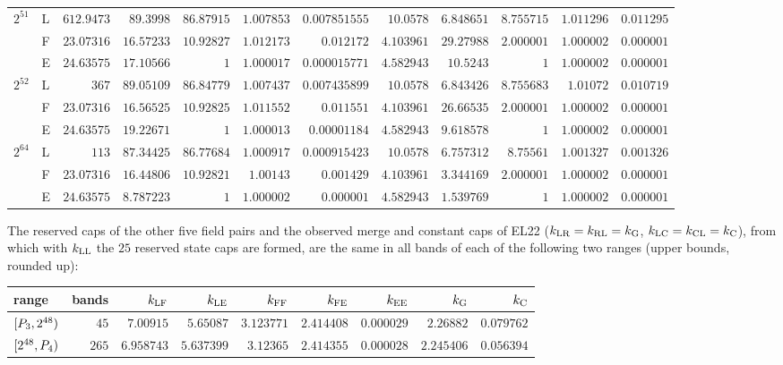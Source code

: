 \begin{center}
\begin{tabular}{@{}llrrrrrrrrrr@{}}
\addlinespace[2pt]
$2^{51}$ & L & $612.9473$ & $89.3998$ & $86.87915$ & $1.007853$ & $0.007851555$ & $10.0578$ & $6.848651$ & $8.755715$ & $1.011296$ & $0.011295$\\
 & F & $23.07316$ & $16.57233$ & $10.92827$ & $1.012173$ & $0.012172$ & $4.103961$ & $29.27988$ & $2.000001$ & $1.000002$ & $0.000001$\\
 & E & $24.63575$ & $17.10566$ & $1$ & $1.000017$ & $0.000015771$ & $4.582943$ & $10.5243$ & $1$ & $1.000002$ & $0.000001$\\
\addlinespace[2pt]
$2^{52}$ & L & $367$ & $89.05109$ & $86.84779$ & $1.007437$ & $0.007435899$ & $10.0578$ & $6.843426$ & $8.755683$ & $1.01072$ & $0.010719$\\
 & F & $23.07316$ & $16.56525$ & $10.92825$ & $1.011552$ & $0.011551$ & $4.103961$ & $26.66535$ & $2.000001$ & $1.000002$ & $0.000001$\\
 & E & $24.63575$ & $19.22671$ & $1$ & $1.000013$ & $0.00001184$ & $4.582943$ & $9.618578$ & $1$ & $1.000002$ & $0.000001$\\
\addlinespace[2pt]
$2^{64}$ & L & $113$ & $87.34425$ & $86.77684$ & $1.000917$ & $0.000915423$ & $10.0578$ & $6.757312$ & $8.75561$ & $1.001327$ & $0.001326$\\
 & F & $23.07316$ & $16.44806$ & $10.92821$ & $1.00143$ & $0.001429$ & $4.103961$ & $3.344169$ & $2.000001$ & $1.000002$ & $0.000001$\\
 & E & $24.63575$ & $8.787223$ & $1$ & $1.000002$ & $0.000001$ & $4.582943$ & $1.539769$ & $1$ & $1.000002$ & $0.000001$\\
\bottomrule
\end{tabular}
\end{center}
The reserved caps of the other five field pairs and the observed merge and
constant caps of EL22 ($k_{\rm LR}=k_{\rm RL}=k_{\rm G}$,
$k_{\rm LC}=k_{\rm CL}=k_{\rm C}$), from which with $k_{\rm LL}$ the $25$ reserved
state caps are formed, are the same in all bands of each of the following two
ranges (upper bounds, rounded up):
\begin{center}\scriptsize\setlength{\tabcolsep}{4pt}
\begin{tabular}{@{}lrrrrrrrr@{}}
\toprule
range & bands & $k_{\rm LF}$ & $k_{\rm LE}$ & $k_{\rm FF}$ & $k_{\rm FE}$ & $k_{\rm EE}$ & $k_{\rm G}$ & $k_{\rm C}$\\
\midrule
$[P_3,2^{48})$ & $45$ & $7.00915$ & $5.65087$ & $3.123771$ & $2.414408$ & $0.000029$ & $2.26882$ & $0.079762$\\
$[2^{48},P_4)$ & $265$ & $6.958743$ & $5.637399$ & $3.12365$ & $2.414355$ & $0.000028$ & $2.245406$ & $0.056394$\\
\bottomrule
\end{tabular}
\end{center}
